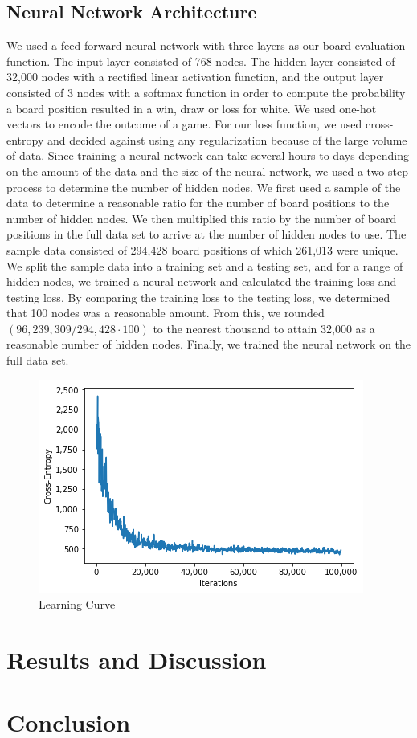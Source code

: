 \documentclass[12pt]{article}
\begin{document}
\subsection{Neural Network Architecture}

We used a feed-forward neural network with three layers as our board evaluation function. The input layer consisted of 768 nodes. The hidden layer consisted of 32,000 nodes with a rectified linear activation function, and the output layer consisted of 3 nodes with a softmax function in order to compute the probability a board position resulted in a win, draw or loss for white. We used one-hot vectors to encode the outcome of a game. For our loss function, we used cross-entropy and decided against using any regularization because of the large volume of data. Since training a neural network can take several hours to days depending on the amount of the data and the size of the neural network, we used a two step process to determine the number of hidden nodes. We first used a sample of the data to determine a reasonable ratio for the number of board positions to the number of hidden nodes. We then multiplied this ratio by the number of board positions in the full data set to arrive at the number of hidden nodes to use. The sample data consisted of 294,428 board positions of which 261,013 were unique. We split the sample data into a training set and a testing set, and for a range of hidden nodes, we trained a neural network and calculated the training loss and testing loss. By comparing the training loss to the testing loss, we determined that 100 nodes was a reasonable amount. From this, we rounded $(96,239,309 / 294,428 \cdot 100)$ to the nearest thousand to attain 32,000 as a reasonable number of hidden nodes. Finally, we trained the neural network on the full data set.

\begin{figure}[h!]
	\centering
	\caption{Learning Curve} \label{f3}
	\includegraphics[scale=0.8]{learning}
\end{figure}

\section{Results and Discussion}

\section{Conclusion}


 
\end{document}
